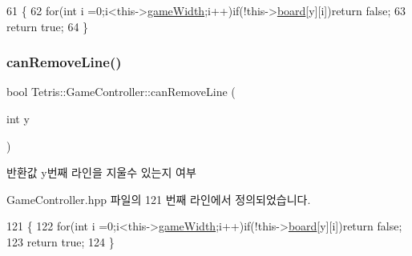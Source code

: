 \begin{DoxyCode}
61                                            \{
62                 \textcolor{keywordflow}{for}(\textcolor{keywordtype}{int} i =0;i<this->\hyperlink{class_tetris_1_1_game_controller_a439f215918db4127fcb44cf9d501ed63}{gameWidth};i++)\textcolor{keywordflow}{if}(!this->\hyperlink{class_tetris_1_1_game_controller_a7725b6cec9459a6bffaa3e29dd1c5196}{board}[y][i])\textcolor{keywordflow}{return} \textcolor{keyword}{false};
63                 \textcolor{keywordflow}{return} \textcolor{keyword}{true};
64             \}
\end{DoxyCode}
\mbox{\label{class_tetris_1_1_game_controller_a912bb473994e869a610ab356086cb0ad}} 
\subsubsection{\texorpdfstring{can\+Remove\+Line()}{canRemoveLine()}\hspace{0.1cm}{\footnotesize\ttfamily [2/2]}}
{\footnotesize\ttfamily bool Tetris\+::\+Game\+Controller\+::can\+Remove\+Line (\begin{DoxyParamCaption}\item[{int}]{y }\end{DoxyParamCaption})\hspace{0.3cm}{\ttfamily [inline]}}

\begin{DoxyReturn}{반환값}
y번째 라인을 지울수 있는지 여부 
\end{DoxyReturn}


Game\+Controller.\+hpp 파일의 121 번째 라인에서 정의되었습니다.


\begin{DoxyCode}
121                                      \{
122                 \textcolor{keywordflow}{for}(\textcolor{keywordtype}{int} i =0;i<this->\hyperlink{class_tetris_1_1_game_controller_a439f215918db4127fcb44cf9d501ed63}{gameWidth};i++)\textcolor{keywordflow}{if}(!this->\hyperlink{class_tetris_1_1_game_controller_a7725b6cec9459a6bffaa3e29dd1c5196}{board}[y][i])\textcolor{keywordflow}{return} \textcolor{keyword}{false};
123                 \textcolor{keywordflow}{return} \textcolor{keyword}{true};
124             \}
\end{DoxyCode}
\mbox{\label{class_tetris_1_1_game_controller_ac8058c827eaa393194dcfb83c6964f8a}} 
